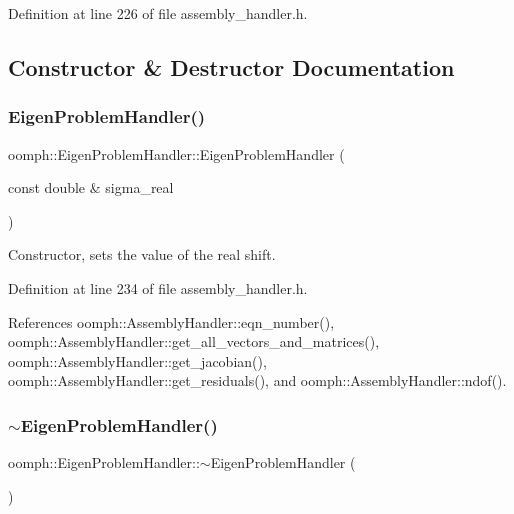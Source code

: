 Definition at line 226 of file assembly\+\_\+handler.\+h.



\subsection{Constructor \& Destructor Documentation}
\mbox{\label{classoomph_1_1EigenProblemHandler_ab5417bddb38214f66ac64b502ca665bc}} 
\subsubsection{\texorpdfstring{Eigen\+Problem\+Handler()}{EigenProblemHandler()}}
{\footnotesize\ttfamily oomph\+::\+Eigen\+Problem\+Handler\+::\+Eigen\+Problem\+Handler (\begin{DoxyParamCaption}\item[{const double \&}]{sigma\+\_\+real }\end{DoxyParamCaption})\hspace{0.3cm}{\ttfamily [inline]}}



Constructor, sets the value of the real shift. 



Definition at line 234 of file assembly\+\_\+handler.\+h.



References oomph\+::\+Assembly\+Handler\+::eqn\+\_\+number(), oomph\+::\+Assembly\+Handler\+::get\+\_\+all\+\_\+vectors\+\_\+and\+\_\+matrices(), oomph\+::\+Assembly\+Handler\+::get\+\_\+jacobian(), oomph\+::\+Assembly\+Handler\+::get\+\_\+residuals(), and oomph\+::\+Assembly\+Handler\+::ndof().

\mbox{\label{classoomph_1_1EigenProblemHandler_aa103e5d9d14e498eeeb07cf8be50cd0d}} 
\subsubsection{\texorpdfstring{$\sim$\+Eigen\+Problem\+Handler()}{~EigenProblemHandler()}}
{\footnotesize\ttfamily oomph\+::\+Eigen\+Problem\+Handler\+::$\sim$\+Eigen\+Problem\+Handler (\begin{DoxyParamCaption}{ }\end{DoxyParamCaption})\hspace{0.3cm}{\ttfamily [inline]}}



